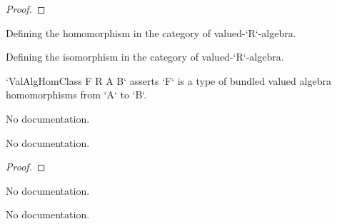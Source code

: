 \begin{proof}
    \leanok
\end{proof}

\begin{definition}\label{ValAlgHom}
        \leanok
                Defining the homomorphism in the category of valued-`R`-algebra.
    \end{definition}

\begin{definition}\label{ValAlgEquiv}
        \leanok
                Defining the isomorphism in the category of valued-`R`-algebra.
    \end{definition}

\begin{definition}\label{ValAlgHomClass}
        \leanok
                `ValAlgHomClass F R A B` asserts `F` is a type of bundled valued algebra homomorphisms
from `A` to `B`.
    \end{definition}

\begin{definition}\label{ValAlgHom.ofAlgHomClassValRingHomClass}
        \leanok
                No documentation.
    \end{definition}

\begin{theorem}\label{comp_valAlgebraMap}
        \leanok
                No documentation.
    \end{theorem}

\begin{proof}
    \leanok
\end{proof}

\begin{definition}\label{ValAlgEquiv.mk'}
                No documentation.
    \end{definition}

\begin{theorem}\label{ValAlgEquiv.coe_mk'}
                No documentation.
    \end{theorem}

